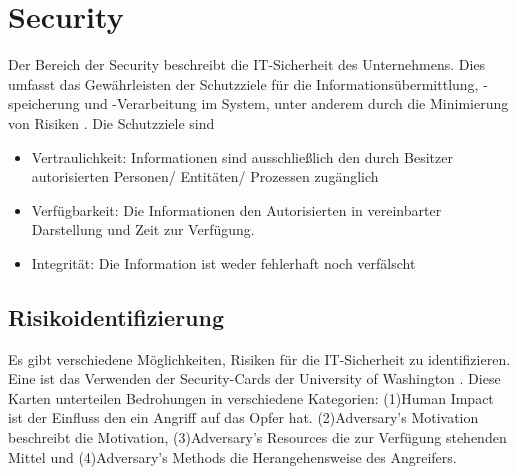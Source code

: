 \section{Security}
Der Bereich der Security beschreibt die IT-Sicherheit des Unternehmens. Dies umfasst das Gewährleisten der Schutzziele
für die Informationsübermittlung, -speicherung und -Verarbeitung im System, unter anderem durch die Minimierung von Risiken \cite{BSIBundesamtfurSicherheitinderInformationstechnik.2008}. Die Schutzziele sind
\begin{itemize}
      \item Vertraulichkeit: Informationen sind ausschließlich den durch Besitzer autorisierten Personen/ Entitäten/ Prozessen zugänglich
      \item Verfügbarkeit: Die Informationen den Autorisierten in vereinbarter Darstellung und Zeit zur Verfügung.
      \item Integrität: Die Information ist weder fehlerhaft noch verfälscht
\end{itemize}
\subsection{Risikoidentifizierung}
\label{Risikoidentifizierung}
Es gibt verschiedene Möglichkeiten, Risiken für die IT-Sicherheit zu identifizieren. Eine ist das Verwenden der \glqq{}Security-Cards\grqq{} der University of Washington \cite{Denning.2013}.
Diese Karten unterteilen Bedrohungen in verschiedene Kategorien: (1)\glqq{}Human Impact\grqq{} ist der Einfluss den ein Angriff auf das Opfer hat. (2)\glqq{}Adversary's Motivation\grqq{} beschreibt die Motivation,
(3)\glqq{}Adversary's Resources\grqq{} die zur Verfügung stehenden Mittel und (4)\glqq{}Adversary's Methods\grqq{} die Herangehensweise des Angreifers.

